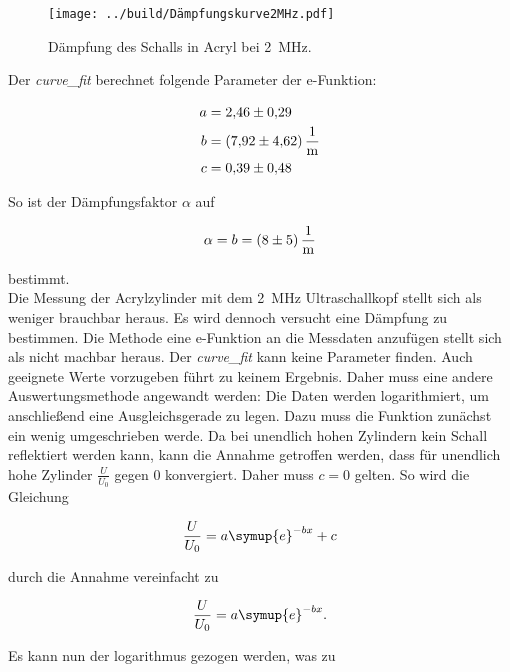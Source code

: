 \begin{figure}[H]
    \centering
    \texttt{[image: ../build/Dämpfungskurve2MHz.pdf]}
    \caption{Dämpfung des Schalls in Acryl bei \qty{2}{\mega\hertz}.}
    \label{fig:Kurve2MHz}
\end{figure}

\noindent Der \emph{curve\_fit} berechnet folgende Parameter der e-Funktion:

\begin{align*}
    a &= \num{2.46\pm0.29} \\
    b &= \qty{7.92\pm4.62}{\per \meter} \\
    c &= \num{0.39\pm0.48} \\
\end{align*}

\noindent So ist der Dämpfungsfaktor $\alpha$ auf 

\begin{align*}
    \alpha = b = \qty{8\pm5}{\per \meter}
\end{align*}

\noindent bestimmt.\\

\noindent Die Messung der Acrylzylinder mit dem \qty{2}{\mega\hertz} Ultraschallkopf stellt sich als weniger brauchbar heraus. 
Es wird dennoch versucht eine Dämpfung zu bestimmen. Die Methode eine e-Funktion an die Messdaten anzufügen stellt 
sich als nicht machbar heraus. Der \emph{curve\_fit} kann keine Parameter finden. Auch geeignete Werte vorzugeben 
führt zu keinem Ergebnis. Daher muss eine andere Auswertungsmethode angewandt werden: Die Daten werden logarithmiert, 
um anschließend eine Ausgleichsgerade zu legen. Dazu muss die Funktion zunächst ein wenig umgeschrieben werde. 
Da bei unendlich hohen Zylindern kein Schall reflektiert werden kann, kann die Annahme getroffen werden, dass für 
unendlich hohe Zylinder $\frac{U}{U_0}$ gegen $0$ konvergiert. Daher muss $c=0$ gelten.
So wird die Gleichung 

\begin{equation*}
    \frac{U}{U_0} = a \symup{e} ^{-bx} +c
\end{equation*}

\noindent durch die Annahme vereinfacht  zu

\begin{equation*}
    \frac{U}{U_0} = a \symup{e} ^{-bx}.
\end{equation*}

\noindent Es kann nun der logarithmus gezogen werden, was zu 

